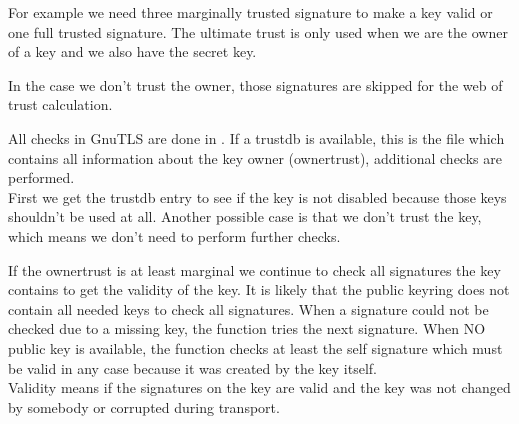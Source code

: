 For example we need three marginally trusted signature to make a key
valid or one full trusted signature. The ultimate trust is only used
when we are the owner of a key and we also have the secret key.
\par
In the case we don't trust the owner, those signatures are skipped
for the web of trust calculation.
\par
All checks in GnuTLS are done in . 
If a trustdb is available, this is the file which contains all information about the
key owner (ownertrust), additional checks are performed.
\\
First we get the trustdb entry to see if the key is not disabled because
those keys shouldn't be used at all. Another possible case is that we
don't trust the key, which means we don't need to perform further checks.
\par
If the ownertrust is at least marginal we continue to check all signatures
the key contains to get the validity of the key. It is likely that the
public keyring does not contain all needed keys to check all signatures.
When a signature could not be checked due to a missing key, the function 
tries the next signature. When NO public key is available, the function
checks at least the self signature which must be valid in any case because
it was created by the key itself.
\\
Validity means if the signatures on the key are valid and the key was not 
changed by somebody or corrupted during transport.

